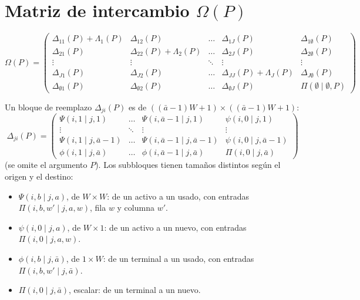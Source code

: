 \documentclass{article}
\begin{document}
\section*{Matriz de intercambio $\Omega(P)$}

$$
\Omega(P)=\begin{pmatrix}
    \Delta_{11}(P)+\Lambda_{1}(P) & \Delta_{12}(P) & \dots & \Delta_{1J}(P) & \Delta_{1\emptyset}(P) \\
    \Delta_{21}(P) & \Delta_{22}(P)+\Lambda_2(P) & \dots & \Delta_{2J}(P) & \Delta_{2\emptyset}(P) \\
    \vdots & \vdots & \ddots & \vdots & \vdots \\
    \Delta_{J1}(P) & \Delta_{J2}(P) & \dots & \Delta_{JJ}(P)+\Lambda_{J}(P) & \Delta_{J\emptyset}(P) \\
    \Delta_{\emptyset 1}(P) & \Delta_{\emptyset 2}(P) & \dots & \Delta_{\emptyset J}(P) & \Pi(\emptyset \mid \emptyset, P)
\end{pmatrix}
$$

Un bloque de reemplazo $\Delta_{ji}(P)$ es de $((\bar{a}-1)W+1)\times((\bar{a}-1)W+1)$:
$$
\Delta_{ji}(P)=
\begin{pmatrix}
    \Psi(i,1\mid j,1) & \dots & \Psi(i,\bar{a}-1 \mid j, 1) & \psi(i, 0 \mid j, 1) \\
    \vdots & \ddots & \vdots & \vdots \\
    \Psi(i,1\mid j, \bar{a}-1) & \dots & \Psi(i,\bar{a}-1 \mid j, \bar{a} - 1) & \psi(i,0 \mid j, \bar{a} - 1) \\
    \phi(i,1 \mid j, \bar{a}) & \dots & \phi(i,\bar{a}-1 \mid j, \bar{a}) & \Pi(i,0 \mid j, \bar{a})
\end{pmatrix}
$$
(se omite el argumento $P$). Los subbloques tienen tamaños distintos según el origen y el destino:
\begin{itemize}
    \item $\Psi(i,b\mid j,a)$, de $W\times W$: de un activo a un usado, con entradas $\Pi(i,b,w'\mid j,a,w)$, fila $w$ y columna $w'$.
    \item $\psi(i,0\mid j,a)$, de $W\times 1$: de un activo a un nuevo, con entradas $\Pi(i,0\mid j,a,w)$.
    \item $\phi(i,b\mid j,\bar{a})$, de $1\times W$: de un terminal a un usado, con entradas $\Pi(i,b,w'\mid j,\bar{a})$.
    \item $\Pi(i,0\mid j,\bar{a})$, escalar: de un terminal a un nuevo.
\end{itemize}
\end{document}
